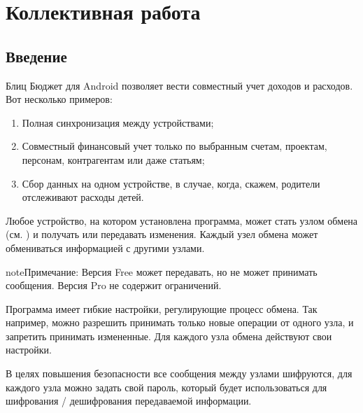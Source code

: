 \documentclass[a4paper,10pt,russian]{sphinxmanual}
\begin{document}
\noindent{}
\noindent{}


\chapter{Коллективная работа}
\label{\detokenize{teamwork:chapter-teamwork}}\label{\detokenize{teamwork:id1}}\label{\detokenize{teamwork::doc}}

\section{Введение}
\label{\detokenize{teamwork:id2}}
Блиц Бюджет для Android позволяет вести совместный учет доходов и расходов. Вот несколько примеров:
\begin{enumerate}
\def\theenumi{\arabic{enumi}}
\def\labelenumi{\theenumi .}
\makeatletter\def\p@enumii{\p@enumi \theenumi .}\makeatother
\item {} 
Полная синхронизация между устройствами;

\item {} 
Совместный финансовый учет только по выбранным счетам, проектам, персонам, контрагентам или даже статьям;

\item {} 
Сбор данных на одном устройстве, в случае, когда, скажем, родители отслеживают расходы детей.

\end{enumerate}

Любое устройство, на котором установлена программа, может стать узлом обмена (см. {\hyperref[\detokenize{glossary:term-1}]{}}) и получать или передавать изменения. Каждый узел обмена может обмениваться информацией с другими узлами.

\begin{sphinxadmonition}{note}{Примечание:}
Версия Free может передавать, но не может принимать сообщения. Версия Pro не содержит ограничений.
\end{sphinxadmonition}

Программа имеет гибкие настройки, регулирующие процесс обмена. Так например, можно разрешить принимать только новые операции от одного узла, и запретить принимать измененные. Для каждого узла обмена действуют свои настройки.

В целях повышения безопасности все сообщения между узлами шифруются, для каждого узла можно задать свой пароль, который будет использоваться для шифрования / дешифрования передаваемой информации.
\end{document}
